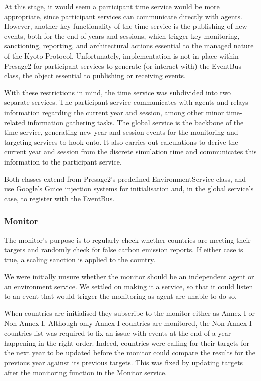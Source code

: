 At this stage, it would seem a participant time service would be more appropriate, since participant services can communicate directly with agents. However, another key functionality of the time service is the publishing of new events, both for the end of years and sessions, which trigger key monitoring, sanctioning, reporting, and architectural actions essential to the managed nature of the Kyoto Protocol. Unfortunately, implementation is not in place within Presage2 for participant services to generate (or interact with) the EventBus class, the object essential to publishing or receiving events.

With these restrictions in mind, the time service was subdivided into two separate services. The participant service communicates with agents and relays information regarding the current year and session, among other minor time-related information gathering tasks. The global service is the backbone of the time service, generating new year and session events for the monitoring and targeting services to hook onto. It also carries out calculations to derive the current year and session from the discrete simulation time and communicates this information to the participant service.

Both classes extend from Presage2's predefined EnvironmentService class, and use Google's Guice injection systems for initialisation and, in the global service's case, to register with the EventBus.

\subsubsection{Monitor}

The monitor's purpose is to regularly check whether countries are meeting their targets and randomly check for false carbon emission reports. If either case is true, a scaling sanction is applied to the country.

We were initially unsure whether the monitor should be an independent agent or an environment service. We settled on making it a service, so that it could listen to an event that would trigger the monitoring as agent are unable to do so.

When countries are initialised they subscribe to the monitor either as Annex I or Non Annex I. Although only Annex I countries are monitored, the Non-Annex I countries list was required to fix an issue with events at the end of a year happening in the right order. Indeed, countries were calling for their targets for the next year to be updated before the monitor could compare the results for the previous year against its previous targets. This was fixed by updating targets after the monitoring function in the Monitor service.

